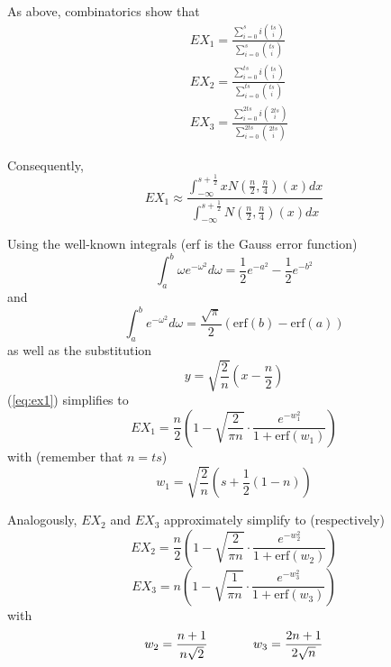 \documentclass[11pt]{article}
\newcommand{\nootag}{}
\begin{document}
As above, combinatorics show that
\begin{align}
  &EX_{1}=\frac{\sum_{i=0}^{s}i\binom{ts}{i}}{\sum_{i=0}^{s}\binom{ts}{i}}\nootag \\
  &EX_{2}=\frac{\sum_{i=0}^{ts}i\binom{ts}{i}}{\sum_{i=0}^{ts}\binom{ts}{i}}\nootag \\
  &EX_{3}=\frac{\sum_{i=0}^{2ts}i\binom{2ts}{i}}{\sum_{i=0}^{2ts}\binom{2ts}{i}}\nootag
\end{align}

Consequently,
\begin{equation}
\label{eq:ex1}
  EX_{1}\approx\frac{\int_{-\infty}^{s+\frac{1}{2}}xN\left(\frac{n}{2},\frac{n}{4}\right)(x)dx}{\int_{-\infty}^{s+\frac{1}{2}}N\left(\frac{n}{2},\frac{n}{4}\right)(x)dx}\nootag
\end{equation}

Using the well-known integrals (erf is the Gauss error function)
\begin{equation}
\int_{a}^{b}\omega{}e^{-\omega{}^{2}}d\omega=\frac{1}{2}e^{-a^{2}}-\frac{1}{2}e^{-b^{2}}
\end{equation}
and
\begin{equation}
\int_{a}^{b}e^{-\omega^{2}}d\omega=\frac{\sqrt{\pi}}{2}\left(\mbox{erf}(b)-\mbox{erf}(a)\right)
\end{equation}
as well as the substitution
\begin{equation}
  y=\sqrt{\frac{2}{n}}\left(x-\frac{n}{2}\right)
\end{equation}
({\ref{eq:ex1}}) simplifies to
\begin{equation}
EX_{1}=\frac{n}{2}\left(1-\sqrt{\frac{2}{\pi{}n}}\cdot\frac{e^{-w_{1}^{2}}}{1+\mbox{erf}(w_{1})}\right)
\end{equation}
with (remember that $n=ts$)
\begin{equation}
  w_{1}=\sqrt{\frac{2}{n}}\left(s+\frac{1}{2}\left(1-n\right)\right)\nootag
\end{equation}

Analogously, $EX_{2}$ and $EX_{3}$ approximately simplify to
(respectively)
\begin{equation}
EX_{2}=\frac{n}{2}\left(1-\sqrt{\frac{2}{\pi{}n}}\cdot\frac{e^{-w_{2}^{2}}}{1+\mbox{erf}(w_{2})}\right)
\end{equation}
\begin{equation}
EX_{3}=n\left(1-\sqrt{\frac{1}{\pi{}n}}\cdot\frac{e^{-w_{3}^{2}}}{1+\mbox{erf}(w_{3})}\right)
\end{equation}
with
\begin{equation}
  w_{2}=\frac{n+1}{n\sqrt{2}}\hspace{.5in}w_{3}=\frac{2n+1}{2\sqrt{n}}
\end{equation}
\end{document}
